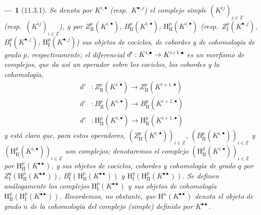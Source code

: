 \documentclass[10pt,oneside,openany]{book}
\theoremstyle{egaenv}\newtheorem*{env}{---}
\theoremstyle{egastatement}
\theoremstyle{egadescription}
\renewcommand{\to}{\mathchoice{\longrightarrow}{\rightarrow}{\rightarrow}{\rightarrow}}
\begin{document}
\begin{env}[11.3.1]
Se denota por $K^{i,\bullet}$ (resp.~$K^{\bullet,j}$) el complejo simple $(K^{ij})_{j\in\mathbb Z}$ (resp.~$(K^{ij})_{i\in\mathbb Z}$), y por $Z_{\mathrm{II}}^p(K^{i,\bullet})$, $B_{\mathrm{II}}^p(K^{i,\bullet})$, $\mathrm H_{\mathrm{II}}^p(K^{i,\bullet})$ (resp.~$Z_{\mathrm I}^p(K^{\bullet,j})$, $B_{\mathrm I}^p(K^{\bullet,j})$, $\mathrm H_{\mathrm I}^p(K^{\bullet,j})$) sus objetos de cociclos, de cobordes y de cohomología de grado $p$, respectivamente;
el diferencial $d':K^{i,\bullet}\to K^{i+1,\bullet}$ es un morfismo de complejos, que da así un operador sobre los cociclos, los cobordes y la cohomología,
\[
\begin{aligned}
  d'&:Z_{\mathrm{II}}^p(K^{i,\bullet})
      \longrightarrow Z_{\mathrm{II}}^p(K^{i+1,\bullet})\\
  d'&:B_{\mathrm{II}}^p(K^{i,\bullet})
      \longrightarrow B_{\mathrm{II}}^p(K^{i+1,\bullet})\\
  d'&:\mathrm H_{\mathrm{II}}^p(K^{i,\bullet})
      \longrightarrow \mathrm H_{\mathrm{II}}^p(K^{i+1,\bullet})
\end{aligned}
\]
y está claro que, para estos operadores, $(Z_{\mathrm{II}}^p(K^{i,\bullet}))_{i\in\mathbb Z}$, $(B_{\mathrm{II}}^p(K^{i,\bullet}))_{i\in\mathbb Z}$ y $(\mathrm H_{\mathrm{II}}^p(K^{i,\bullet}))_{i\in\mathbb Z}$ son complejos;
denotaremos el complejo $(\mathrm H_{\mathrm{II}}^p(K^{i,\bullet}))_{i\in\mathbb Z}$ por $\mathrm H_{\mathrm{II}}^p(K^{\bullet\bullet})$, y sus objetos de cociclos, cobordes y cohomología de grado $q$ por $Z_{\mathrm I}^q(\mathrm H_{\mathrm{II}}^p(K^{\bullet\bullet}))$, $B_{\mathrm I}^q(\mathrm H_{\mathrm{II}}^p(K^{\bullet\bullet}))$ y $\mathrm H_{\mathrm I}^q(\mathrm H_{\mathrm{II}}^p(K^{\bullet\bullet}))$.
Se definen análogamente los complejos $\mathrm H_{\mathrm I}^p(K^{\bullet\bullet})$ y sus objetos de cohomología $\mathrm H_{\mathrm{II}}^q(\mathrm H_{\mathrm I}^p(K^{\bullet\bullet}))$.
Recordemos, no obstante, que $\mathrm H^n(K^{\bullet\bullet})$ denota el objeto de grado $n$ de la cohomología del complejo \emph{(simple)} definido por $K^{\bullet\bullet}$.
\end{env}
\end{document}

